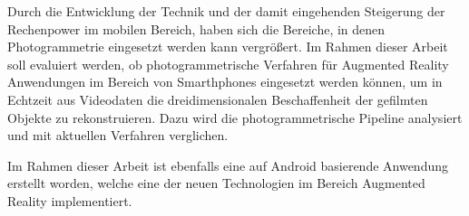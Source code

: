 Durch die Entwicklung der Technik und der damit eingehenden Steigerung der Rechenpower im mobilen Bereich, haben sich die Bereiche, in denen Photogrammetrie eingesetzt werden kann vergrößert. Im Rahmen dieser Arbeit soll evaluiert werden, ob photogrammetrische Verfahren für Augmented Reality Anwendungen im Bereich von Smarthphones eingesetzt werden können, um in Echtzeit aus Videodaten die dreidimensionalen Beschaffenheit der gefilmten Objekte zu rekonstruieren. Dazu wird die photogrammetrische Pipeline analysiert und mit aktuellen Verfahren verglichen.

Im Rahmen dieser Arbeit ist ebenfalls eine auf Android basierende Anwendung erstellt worden, welche eine der neuen Technologien im Bereich Augmented Reality implementiert.



  


